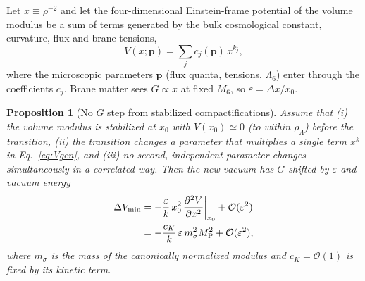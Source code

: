 \documentclass[aps,prd,reprint,superscriptaddress,nofootinbib,floatfix]{revtex4-2}
\newtheorem{proposition}{Proposition}
\theoremstyle{definition}
\newcommand{\MP}{M_{\rm P}}
\begin{document}
Let $x\equiv\rho^{-2}$ and let the four-dimensional Einstein-frame potential of the volume modulus be a sum of terms generated by the bulk cosmological constant, curvature, flux and brane tensions,
\begin{equation}
V(x;\bm p) = \sum_j c_j(\bm p)\, x^{k_j}, \label{eq:Vgen}
\end{equation}
where the microscopic parameters $\bm p$ (flux quanta, tensions, $\Lambda_6$) enter through the coefficients $c_j$. Brane matter sees $G \propto x$ at fixed $M_6$, so $\varepsilon = \Delta x/x_0$.

\begin{proposition}[No $G$ step from stabilized compactifications]\label{prop:nogo}
Assume that (i) the volume modulus is stabilized at $x_0$ with $V(x_0)\simeq0$ (to within $\rho_\Lambda$) before the transition, (ii) the transition changes a parameter that multiplies a single term $x^{k}$ in Eq.~\eqref{eq:Vgen}, and (iii) no second, independent parameter changes simultaneously in a correlated way. Then the new vacuum has $G$ shifted by $\varepsilon$ and vacuum energy
\begin{equation}
\begin{split}
\Delta V_{\min} &= -\frac{\varepsilon}{k}\, x_0^2\, \frac{\partial^2V}{\partial x^2}\bigg|_{x_0} + \mathcal{O}(\varepsilon^2)\\
&= -\frac{c_K}{k}\,\varepsilon\, m_\sigma^2\MP^2 + \mathcal{O}(\varepsilon^2),
\end{split} \label{eq:dV}
\end{equation}
where $m_\sigma$ is the mass of the canonically normalized modulus and $c_K=\mathcal{O}(1)$ is fixed by its kinetic term.
\end{proposition}
\end{document}
